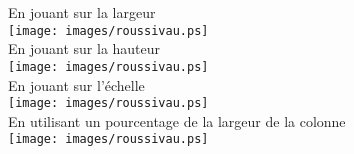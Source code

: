 \documentclass[10pt,a4paper]{article}
\begin{document}
En jouant sur la largeur\\
\texttt{[image: images/roussivau.ps]}\\


En jouant sur la hauteur\\
\texttt{[image: images/roussivau.ps]}\\


En jouant sur l'échelle\\
\texttt{[image: images/roussivau.ps]}\\

En utilisant un pourcentage de la largeur de la colonne\\
\texttt{[image: images/roussivau.ps]}
\end{document}

